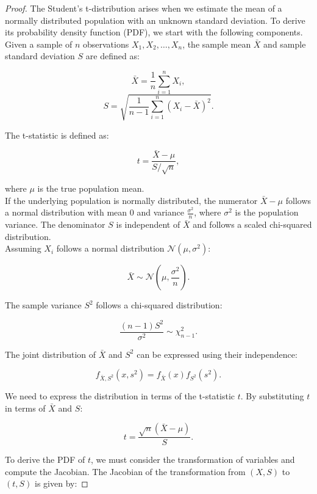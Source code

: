 \begin{proof}
    The Student's t-distribution arises when we estimate the mean of a normally distributed population with an unknown standard deviation. To derive its probability density function (PDF), we start with the following components.\\

    Given a sample of \( n \) observations \( X_1, X_2, \ldots, X_n \), the sample mean \( \bar{X} \) and sample standard deviation \( S \) are defined as:

   \[
   \bar{X} = \frac{1}{n} \sum_{i=1}^{n} X_i,
   \]
   \[
   S = \sqrt{\frac{1}{n-1} \sum_{i=1}^{n} (X_i - \bar{X})^2}.
   \]

   The t-statistic is defined as:

   \[
   t = \frac{\bar{X} - \mu}{S / \sqrt{n}},
   \]

   where \( \mu \) is the true population mean. \\

   If the underlying population is normally distributed, the numerator \( \bar{X} - \mu \) follows a normal distribution with mean \( 0 \) and variance \( \frac{\sigma^2}{n} \), where \( \sigma^2 \) is the population variance. The denominator \( S \) is independent of \( \bar{X} \) and follows a scaled chi-squared distribution. \\

   Assuming \( X_i \) follows a normal distribution \( \mathcal{N}(\mu, \sigma^2) \):

\[
\bar{X} \sim \mathcal{N}\left(\mu, \frac{\sigma^2}{n}\right).
\]

The sample variance \( S^2 \) follows a chi-squared distribution:

\[
\frac{(n-1)S^2}{\sigma^2} \sim \chi^2_{n-1}.
\]

The joint distribution of \( \bar{X} \) and \( S^2 \) can be expressed using their independence:

\[
f_{\bar{X}, S^2}(x, s^2) = f_{\bar{X}}(x) f_{S^2}(s^2).
\]

We need to express the distribution in terms of the t-statistic \( t \). By substituting \( t \) in terms of \( \bar{X} \) and \( S \):

\[
t = \frac{\sqrt{n}(\bar{X} - \mu)}{S}.
\]

To derive the PDF of \( t \), we must consider the transformation of variables and compute the Jacobian. The Jacobian of the transformation from \( (X, S) \) to \( (t, S) \) is given by:


\end{proof}
